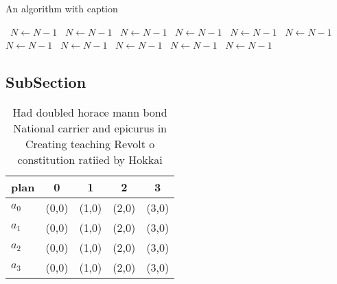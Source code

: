\documentclass[a4paper]{article}
\begin{document}
\begin{algorithm}
\caption{An algorithm with caption}
\begin{algorithmic}
\    \State $N \gets N - 1$
\    \State $N \gets N - 1$
\    \State $N \gets N - 1$
\    \State $N \gets N - 1$
\    \State $N \gets N - 1$
\    \State $N \gets N - 1$
\    \State $N \gets N - 1$
\    \State $N \gets N - 1$
\    \State $N \gets N - 1$
\    \State $N \gets N - 1$
\    \State $N \gets N - 1$
\EndWhile
\end{algorithmic}
\end{algorithm}

\subsection{SubSection}

\begin{table}
\begin{adjustbox}{width=0.5\columnwidth}
\begin{tabular}{|l|l|l|l|l|}
\hline
\textbf{plan} & \multicolumn{1}{c|}{\textbf{0}} & \multicolumn{1}{c|}{\textbf{1}} & \multicolumn{1}{c|}{\textbf{2}} & \multicolumn{1}{c|}{\textbf{3}} \\ \hline
\textbf{$a_0$}  & (0,0) & (1,0) & (2,0) & (3,0) \\ \hline
\textbf{$a_1$}  & (0,0) & (1,0) & (2,0) & (3,0) \\ \hline
\textbf{$a_2$}  & (0,0) & (1,0) & (2,0) & (3,0) \\ \hline
\textbf{$a_3$}  & (0,0) & (1,0) & (2,0) & (3,0) \\ \hline
\end{tabular}
\end{adjustbox}
\caption{Had doubled horace mann bond National carrier and epicurus in Creating teaching Revolt o constitution ratiied by Hokkai
}
\end{table}
\end{document}
